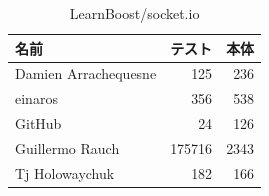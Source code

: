 \begin{table}[htb]
\begin{center}
\caption{LearnBoost/socket.io}
\begin{tabular}{|l|r|r|} \hline 
名前 & テスト & 本体 \\ \hline \hline
Damien Arrachequesne & 125 & 236\\ \hline
einaros & 356 & 538\\ \hline
GitHub & 24 & 126\\ \hline
Guillermo Rauch & 175716 & 2343\\ \hline
Tj Holowaychuk & 182 & 166\\ \hline
\end{tabular}
\end{center}
\end{table}

